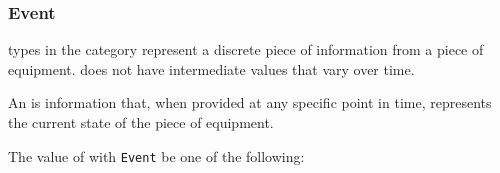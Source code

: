 \FloatBarrier

\subsubsection{Event}
  \label{sec:Event}



 types in the  category represent a discrete piece of information from a piece of equipment.   does not have intermediate values that vary over time.

An  is information that, when provided at any specific point in time, represents the current state of the piece of equipment.


The value of  with  \texttt{Event} \MUST be one of the following:
